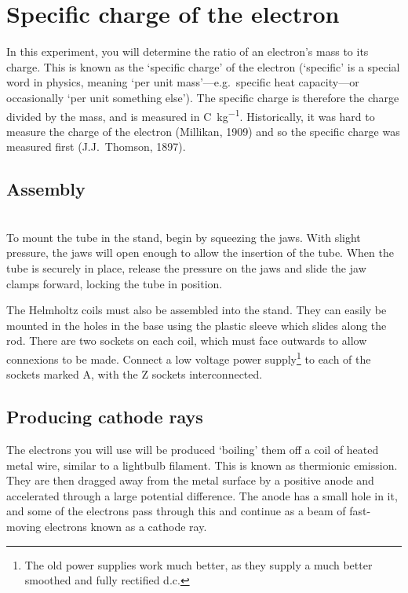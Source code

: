 \section{Specific charge of the electron}
\label{electron}

In this experiment, you will determine the ratio of an electron's mass to its charge.  This is known as the `specific charge' of the electron (`specific' is a special word in physics, meaning `per unit mass'---e.g.\ specific heat capacity---or occasionally `per unit something else').  The specific charge is therefore the charge divided by the mass, and is measured in \si{C.kg^{-1}}.  Historically, it was hard to measure the charge of the electron (Millikan, 1909) and so the specific charge was measured first (J.J.~Thomson, 1897).

\subsection{Assembly}

\\

To mount the tube in the stand, begin by squeezing the jaws.  With slight pressure, the jaws will open enough to allow the insertion of the tube.  When the tube is securely in place, release the pressure on the jaws and slide the jaw clamps forward, locking the tube in position.

The Helmholtz coils must also be assembled into the stand.  They can easily be mounted in the holes in the base using the plastic sleeve which slides along the rod.  There are two sockets on each coil, which must face outwards to allow connexions to be made.  Connect a low voltage power supply\footnote{The old power supplies work much better, as they supply a much better smoothed and fully rectified d.c.} to each of the sockets marked A, with the Z sockets interconnected.

\subsection{Producing cathode rays}
The electrons you will use will be produced `boiling' them off a coil of heated metal wire, similar to a lightbulb filament.  This is known as thermionic emission.  They are then dragged away from the metal surface by a positive anode and accelerated through a large potential difference.  The anode has a small hole in it, and some of the electrons pass through this and continue as a beam of fast-moving electrons known as a cathode ray.

